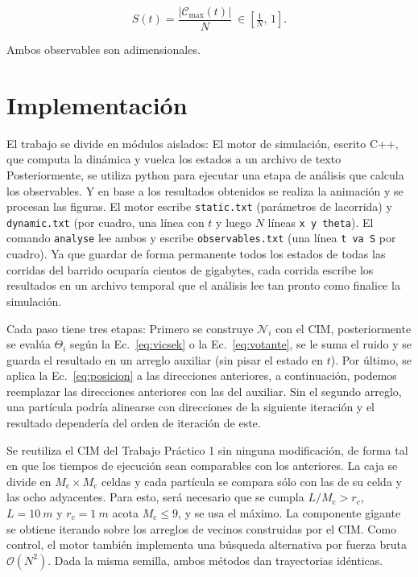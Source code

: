 \documentclass[10pt,a4paper]{article}
\newcommand{\Mc}{\ensuremath{M_{\mathrm{c}}}}
\newcommand{\Cmax}{\ensuremath{\mathcal{C}_{\mathrm{max}}}}
\begin{document}
\begin{equation}
    S(t) = \frac{|\Cmax(t)|}{N} \ \in \left[\tfrac{1}{N},\,1\right].
    \label{eq:componente}
\end{equation}

Ambos observables son adimensionales.

\section{Implementación}

El trabajo se divide en módulos aislados: El motor de simulación, escrito C++, que computa la dinámica y vuelca los estados a un archivo de texto
Posteriormente, se utiliza python para ejecutar una etapa de análisis que calcula los observables. Y en base a los resultados obtenidos se realiza la animación y se procesan las figuras.
El motor escribe \texttt{static.txt} (parámetros de lacorrida) y \texttt{dynamic.txt} (por cuadro, una línea con $t$ y luego $N$ líneas \texttt{x y theta}). El comando \texttt{analyse} lee ambos y escribe \texttt{observables.txt} (una línea \texttt{t va S} por cuadro).
Ya que guardar de forma permanente todos los estados de todas las corridas del barrido ocuparía cientos de gigabytes, cada corrida escribe los resultados en un archivo temporal que el análisis lee tan pronto como finalice la simulación.

Cada paso tiene tres etapas:
Primero se construye $\mathcal{N}_i$ con el CIM,
posteriormente se evalúa $\Theta_i$ según la Ec.~\eqref{eq:vicsek} o la Ec.~\eqref{eq:votante}, se le suma el ruido y se guarda el resultado en un arreglo auxiliar (sin pisar el estado en $t$).
Por último, se aplica la Ec.~\eqref{eq:posicion} a las direcciones anteriores, a continuación, podemos reemplazar las direcciones anteriores con las del auxiliar. Sin el segundo arreglo, una partícula podría alinearse con direcciones de la siguiente iteración y el resultado dependería del orden de iteración de este.

Se reutiliza el CIM del Trabajo Práctico 1 sin ninguna modificación, de forma tal en que los tiempos de ejecución sean comparables con los anteriores. La caja se divide en $\Mc \times \Mc$ celdas y cada partícula se compara sólo con las de su celda y las ocho adyacentes. Para esto, será necesario que se cumpla $L/\Mc > r_c$, $L = \SI{10}{m}$ y $r_c = \SI{1}{m}$ acota $\Mc \le 9$, y se usa el máximo.
La componente gigante se obtiene iterando sobre los arreglos de vecinos construidas por el CIM. Como control, el motor también implementa una búsqueda alternativa por fuerza bruta $\mathcal{O}(N^2)$. Dada la misma semilla, ambos métodos dan trayectorias idénticas.
\end{document}
